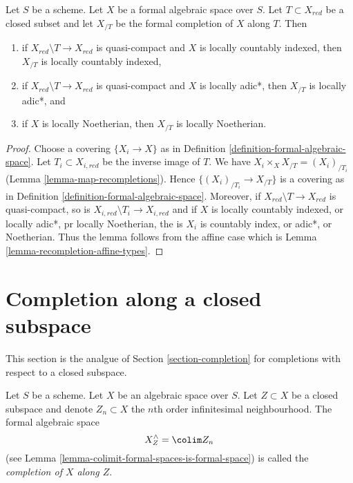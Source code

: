 \begin{lemma}
\label{lemma-recompletion-types}
Let $S$ be a scheme. Let $X$ be a formal algebraic space over $S$.
Let $T \subset X_{red}$ be a closed subset and let $X_{/T}$
be the formal completion of $X$ along $T$. Then
\begin{enumerate}
\item if $X_{red} \setminus T \to X_{red}$ is quasi-compact and $X$
is locally countably indexed, then $X_{/T}$ is locally countably indexed,
\item if $X_{red} \setminus T \to X_{red}$ is quasi-compact and $X$
is locally adic*, then $X_{/T}$ is locally adic*, and
\item if $X$ is locally Noetherian, then $X_{/T}$ is locally Noetherian.
\end{enumerate}
\end{lemma}

\begin{proof}
Choose a covering $\{X_i \to X\}$ as in
Definition \ref{definition-formal-algebraic-space}.
Let $T_i \subset X_{i, red}$ be the inverse image of $T$.
We have $X_i \times_X X_{/T} = (X_i)_{/T_i}$
(Lemma \ref{lemma-map-recompletions}).
Hence $\{(X_i)_{/T_i} \to X_{/T}\}$ is a covering as in
Definition \ref{definition-formal-algebraic-space}.
Moreover, if $X_{red} \setminus T \to X_{red}$ is quasi-compact, so is
$X_{i, red} \setminus T_i \to X_{i, red}$
and if $X$ is locally countably indexed, or locally adic*, pr
locally Noetherian, the is $X_i$ is countably index, or adic*,
or Noetherian. Thus the lemma follows from the affine case which is
Lemma \ref{lemma-recompletion-affine-types}.
\end{proof}








\section{Completion along a closed subspace}
\label{section-completion-subspace}

\noindent
This section is the analgue of Section \ref{section-completion}
for completions with respect to a closed subspace.

\begin{definition}
\label{definition-completion-subspace}
Let $S$ be a scheme. Let $X$ be an algebraic space over $S$.
Let $Z \subset X$ be a closed subspace and denote $Z_n \subset X$
the $n$th order infinitesimal neighbourhood. The formal algebraic space
$$
X^\wedge_Z = \colim Z_n
$$
(see Lemma \ref{lemma-colimit-formal-spaces-is-formal-space})
is called the {\it completion of $X$ along $Z$}.
\end{definition}

